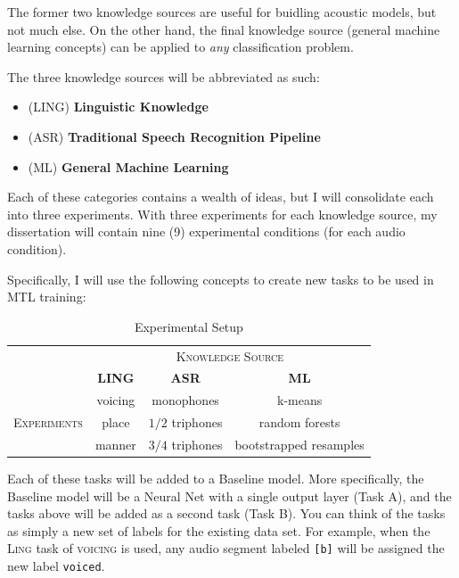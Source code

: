 \documentclass[10pt,a4paper]{article}
\begin{document}
The former two knowledge sources are useful for buidling acoustic models, but not much else. On the other hand, the final knowledge source (general machine learning concepts) can be applied to \textit{any} classification problem.

The three knowledge sources will be abbreviated as such:
  
\begin{itemize}
\item  (\textsc{LING}) \textbf{Linguistic Knowledge} 
\item (\textsc{ASR}) \textbf{Traditional Speech Recognition Pipeline}
\item (\textsc{ML}) \textbf{General Machine Learning}
\end{itemize}


Each of these categories contains a wealth of ideas, but I will consolidate each into three experiments. With three experiments for each knowledge source, my dissertation will contain nine (9) experimental conditions (for each audio condition).

Specifically, I will use the following concepts to create new tasks to be used in MTL training:

\begin{table}[!htbp]
  \centering
  \begin{adjustbox}{width=.55\textwidth}
    \begin{tabular}{cccc}
      \toprule
      & \multicolumn{3}{c}{\textsc{Knowledge Source}}\\
      & \textbf{LING} & \textbf{ASR} & \textbf{ML}\\
      \midrule
      \multirow{3}{*}{\textsc{Experiments}} & voicing & monophones &  k-means \\
      & place & $1/2$ triphones & random forests  \\
      & manner & $3/4$ triphones &  bootstrapped resamples  \\
      \bottomrule
    \end{tabular}
    \label{table:data}
  \end{adjustbox}
  
  \caption{Experimental Setup}
  
\end{table}


Each of these tasks will be added to a Baseline model. More specifically, the Baseline model will be a Neural Net with a single output layer (Task A), and the tasks above will be added as a second task (Task B). You can think of the tasks as simply a new set of labels for the existing data set. For example, when the \textsc{Ling} task of \textsc{voicing} is used, any audio segment labeled \texttt{[b]} will be assigned the new label \texttt{voiced}.
\end{document}
